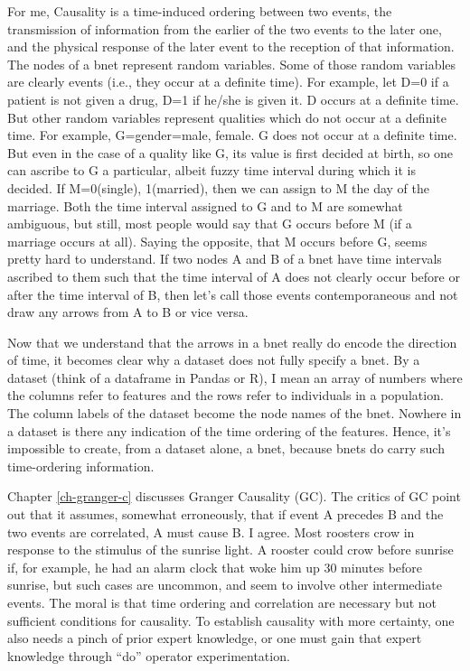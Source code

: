 For me, Causality is a time-induced ordering between two events, the
transmission of information from the earlier of the two events to the later
one, and the physical response of the later event to the reception of that
information. The nodes of a bnet represent random variables. Some of those
random variables are clearly events (i.e., they occur at a definite time).
For example, let D=0 if a patient is not given a drug, D=1 if he/she is given
it. D occurs at a definite time. But other random variables represent
qualities which do not occur at a definite time. For example,
G=gender=male, female. G does not occur at a definite time.  But even in the
case of a quality like G, its value is first decided at birth, so one can
ascribe to G a particular, albeit fuzzy time interval during which it is
decided. If M=0(single), 1(married), then we can assign to M the day of the
marriage. Both the time interval assigned to G and to  M are somewhat
ambiguous, but still, most people would say that G occurs before M (if a
marriage occurs at all). Saying the opposite, that M occurs before G, seems
pretty hard to understand. If two nodes A and B of a bnet have time intervals
ascribed to them such that the time interval of A does not clearly occur
before or after the time interval of B, then let’s call those events
contemporaneous and not draw any arrows from A to B or vice versa.

Now that we understand that the arrows in a bnet really do encode the
direction of time, it becomes clear why a dataset does not fully specify a
bnet. By a dataset (think of a dataframe in Pandas or R), I mean an array of
numbers where the columns refer to features and the rows refer to individuals
in a population. The column labels of the dataset become the node names of
the bnet. Nowhere in a dataset is there any indication of the time ordering
of the features. Hence, it’s impossible to create, from a dataset alone, a
bnet, because bnets do carry such time-ordering information.

Chapter \ref{ch-granger-c} discusses
 Granger Causality
(GC). The critics of GC point out that it assumes, somewhat erroneously,
that if event A precedes B and the two events are correlated, A must
cause B. I agree. Most roosters crow in response to the stimulus of the
sunrise light.  A rooster could crow before sunrise if,  for example,  he
had an alarm clock that woke him up 30 minutes before sunrise, but such cases
are uncommon, and seem to involve other intermediate events.  The moral is
that time ordering and correlation are necessary but not sufficient
conditions for causality. To establish causality with more certainty, one
also needs a pinch of prior expert knowledge, or one must gain that expert
knowledge through ``do” operator experimentation.



